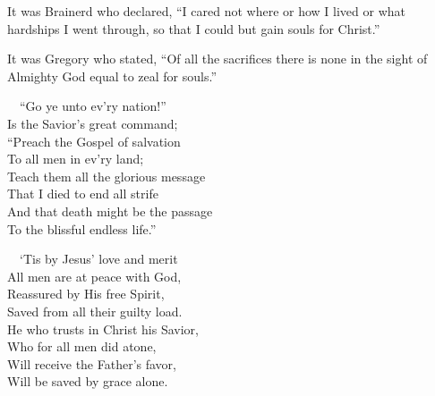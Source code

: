 \documentclass[
]{book}
\begin{document}
It was Brainerd who declared, ``I cared not where or how I lived or what hardships I went through, so that I could but gain souls for Christ.''

It was Gregory who stated, ``Of all the sacrifices there is none in the sight of Almighty God equal to zeal for souls.''

~~``Go ye unto ev'ry nation!''\\
\hspace*{0.333em}\hspace*{0.333em}Is the Savior's great command;\\
\hspace*{0.333em}\hspace*{0.333em}``Preach the Gospel of salvation\\
\hspace*{0.333em}\hspace*{0.333em}To all men in ev'ry land;\\
\hspace*{0.333em}\hspace*{0.333em}Teach them all the glorious message\\
\hspace*{0.333em}\hspace*{0.333em}That I died to end all strife\\
\hspace*{0.333em}\hspace*{0.333em}And that death might be the passage\\
\hspace*{0.333em}\hspace*{0.333em}To the blissful endless life.''

~~`Tis by Jesus' love and merit\\
\hspace*{0.333em}\hspace*{0.333em}All men are at peace with God,\\
\hspace*{0.333em}\hspace*{0.333em}Reassured by His free Spirit,\\
\hspace*{0.333em}\hspace*{0.333em}Saved from all their guilty load.\\
\hspace*{0.333em}\hspace*{0.333em}He who trusts in Christ his Savior,\\
\hspace*{0.333em}\hspace*{0.333em}Who for all men did atone,\\
\hspace*{0.333em}\hspace*{0.333em}Will receive the Father's favor,\\
\hspace*{0.333em}\hspace*{0.333em}Will be saved by grace alone.
\end{document}
